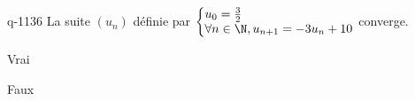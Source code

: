 \begin{truefalse}{q-1136}
La suite $(u_n)$ définie par $\left\{ \begin{array}{@{} l @{}} u_0 = \frac 32 \\ \forall n\in \N, u_{n+1}=-3u_{n}+10 \end{array} \right.$ converge.
\item Vrai
\item* Faux
\end{truefalse}

